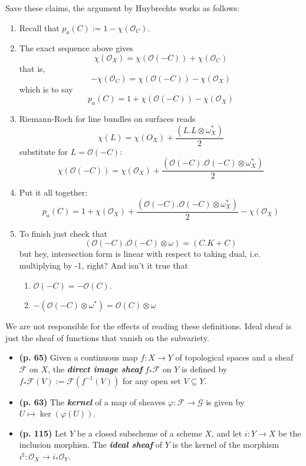 Save these claims, the argument by Huybrechts works as follows:
\begin{enumerate}[label=\textbf{Step \arabic*}]
\item Recall that \(p_a(C):=1-\chi(\mathcal{O}_C)\).
\item The exact sequence above gives \[\chi(\mathcal{O}_X)=\chi(\mathcal{O}(-C))+\chi(\mathcal{O}_C)\]
	that is,
	\[-\chi(\mathcal{O}_C)=\chi(\mathcal{O}(-C))-\chi(\mathcal{O}_X)\]
which is to say
\[p_a(C)=1+\chi(\mathcal{O}(-C))-\chi(\mathcal{O}_X)\]
\item Riemann-Roch for line bundles on surfaces reads
	\[\boxed{\chi(L)=\chi(O_X)+\frac{(L.L \otimes \omega_X^*)}{2}}\]
substitute for \(L=\mathcal{O}(-C)\):
\[\chi(\mathcal{O}(-C))=\chi(\mathcal{O}_X)+\frac{(\mathcal{O}(-C).\mathcal{O}(-C)\otimes \omega_X^*)}{2}\]
\item Put it all together:
	\[p_a(C)=1+\chi(\mathcal{O}_X)+\frac{(\mathcal{O}(-C).\mathcal{O}(-C)\otimes \omega_X^*)}{2}-\chi(\mathcal{O}_X)\]
\item To finish just check that
	\[(\mathcal{O}(-C).\mathcal{O}(-C) \otimes \omega)=(C.K+C)\]
but hey, intersection form is linear with respect to taking dual, i.e. multiplying by -1, right? And isn't it true that
\begin{enumerate}
\item \(\mathcal{O}(-C)=-\mathcal{O}(C)\).
\item \(-(\mathcal{O}(-C) \otimes \omega^*)=\mathcal{O}(C) \otimes \omega\)
\end{enumerate}
\end{enumerate}

\begin{defn}\leavevmode
We are not responsible for the effects of reading these definitions. Ideal sheaf is just the sheaf of functions that vanish on the subvariety.
\begin{itemize}
\item \textbf{(p. 65)} Given a continuous map \(f:X \to Y\) of topological spaces and a sheaf \(\mathcal{F}\) on \(X\), the \textit{\textbf{direct image sheaf}} \(f_*\mathcal{F}\) on \(Y\) is defined by \(f_*\mathcal{F}(V):=\mathcal{F}(f^{-1}(V))\) for any open set \(V \subseteq Y\).

\item \textbf{(p. 63)} The \textit{\textbf{kernel}} of a map of sheaves \(\varphi: \mathcal{F} \to \mathcal{G}\) is given by \(U \mapsto  \ker(\varphi(U))\).

\item \textbf{(p. 115)} Let \(Y\) be a closed subscheme of a scheme \(X\), and let \(i:Y \to X\) be the inclusion morphisn. The \textit{\textbf{ideal sheaf}} of \(Y\) is the kernel of the morphism \(i^\sharp:\mathcal{O}_X \to i_*\mathcal{O}_Y\).
\end{itemize}
\end{defn}

